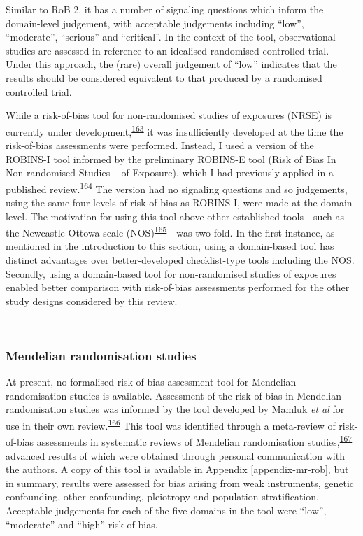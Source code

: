 \documentclass[a4paper, twoside]{templates/ociamthesis}
\begin{document}
Similar to RoB 2, it has a number of signaling questions which inform the domain-level judgement, with acceptable judgements including ``low'', ``moderate'', ``serious'' and ``critical''. In the context of the tool, observational studies are assessed in reference to an idealised randomised controlled trial. Under this approach, the (rare) overall judgement of ``low'' indicates that the results should be considered equivalent to that produced by a randomised controlled trial.

While a risk-of-bias tool for non-randomised studies of exposures (NRSE) is currently under development,\textsuperscript{\protect\hyperlink{ref-morganr2020}{163}} it was insufficiently developed at the time the risk-of-bias assessments were performed. Instead, I used a version of the ROBINS-I tool informed by the preliminary ROBINS-E tool (Risk of Bias In Non-randomised Studies -- of Exposure), which I had previously applied in a published review.\textsuperscript{\protect\hyperlink{ref-french2019}{164}} The version had no signaling questions and so judgements, using the same four levels of risk of bias as ROBINS-I, were made at the domain level. The motivation for using this tool above other established tools - such as the Newcastle-Ottowa scale (NOS)\textsuperscript{\protect\hyperlink{ref-wells2000}{165}} - was two-fold. In the first instance, as mentioned in the introduction to this section, using a domain-based tool has distinct advantages over better-developed checklist-type tools including the NOS. Secondly, using a domain-based tool for non-randomised studies of exposures enabled better comparison with risk-of-bias assessments performed for the other study designs considered by this review.

~

\hypertarget{mendelian-randomisation-studies}{%
\subsubsection{Mendelian randomisation studies}\label{mendelian-randomisation-studies}}

At present, no formalised risk-of-bias assessment tool for Mendelian randomisation studies is available. Assessment of the risk of bias in Mendelian randomisation studies was informed by the tool developed by Mamluk \emph{et al} for use in their own review.\textsuperscript{\protect\hyperlink{ref-mamluk2020}{166}} This tool was identified through a meta-review of risk-of-bias assessments in systematic reviews of Mendelian randomisation studies,\textsuperscript{\protect\hyperlink{ref-spiga2021}{167}} advanced results of which were obtained through personal communication with the authors. A copy of this tool is available in Appendix \ref{appendix-mr-rob}, but in summary, results were assessed for bias arising from weak instruments, genetic confounding, other confounding, pleiotropy and population stratification. Acceptable judgements for each of the five domains in the tool were ``low'', ``moderate'' and ``high'' risk of bias.
\end{document}
